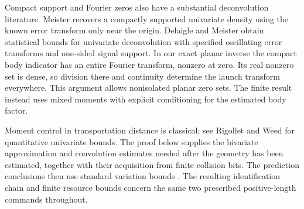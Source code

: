 Compact support and Fourier zeros also have a substantial
deconvolution literature. Meister \cite[Section~2 and Theorem~1]{MeisterCompact}
recovers a compactly supported univariate density using the known
error transform only near the origin. Delaigle and Meister
\cite[Theorem~4.1]{DelaigleMeister} obtain statistical bounds for
univariate deconvolution with specified oscillating error transforms
and one-sided signal support. In our exact planar inverse the compact
body indicator has an entire Fourier transform, nonzero at zero.
Its real nonzero set is dense, so division there and continuity
determine the launch transform everywhere. This argument allows
nonisolated planar zero sets. The finite result instead uses mixed
moments with explicit conditioning for the estimated body factor.

Moment control in transportation distance is classical; see
Rigollet and Weed \cite[Section~2.3, Theorem~4 and Corollary~1]{RigolletWeed}
for quantitative univariate bounds. The proof below supplies the
bivariate approximation and convolution estimates needed after the
geometry has been estimated, together with their acquisition from
finite collision bits. The prediction conclusions then use standard
variation bounds \cite{AFP,Galerne}. The resulting identification
chain and finite resource bounds concern the same two prescribed
positive-length commands throughout.
